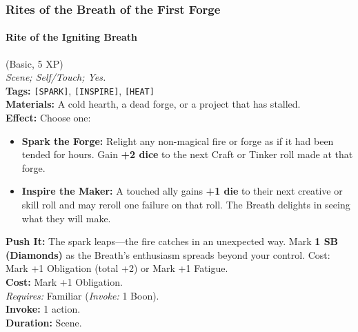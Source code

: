 \subsubsection*{Rites of the Breath of the First Forge}
\paragraph{Rite of the Igniting Breath} (Basic, 5 XP) \hfill \\
\emph{Scene; Self/Touch; Yes.} \\
\textbf{Tags:} \texttt{[SPARK]}, \texttt{[INSPIRE]}, \texttt{[HEAT]} \\
\textbf{Materials:} A cold hearth, a dead forge, or a project that has stalled. \\
\textbf{Effect:} Choose one:
\begin{itemize}
  \item \textbf{Spark the Forge:} Relight any non-magical fire or forge as if it had been tended for hours. Gain \textbf{+2 dice} to the next Craft or Tinker roll made at that forge.
  \item \textbf{Inspire the Maker:} A touched ally gains \textbf{+1 die} to their next creative or skill roll and may reroll one failure on that roll. The Breath delights in seeing what they will make.
\end{itemize}
\textbf{Push It:} The spark leaps---the fire catches in an unexpected way. Mark \textbf{1 SB (Diamonds)} as the Breath's enthusiasm spreads beyond your control. Cost: Mark +1 Obligation (total +2) or Mark +1 Fatigue. \\
\textbf{Cost:} Mark +1 Obligation. \\
\textit{Requires:} Familiar (\textit{Invoke:} 1 Boon). \\
\textbf{Invoke:} 1 action. \\
\textbf{Duration:} Scene.

